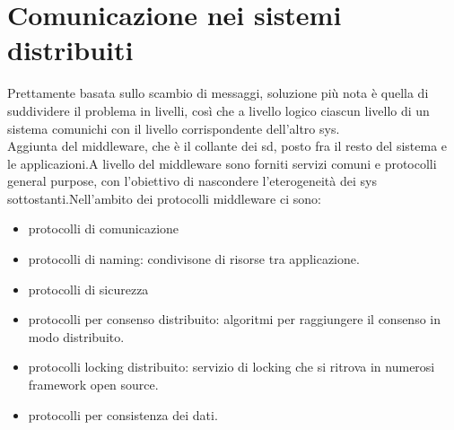 \documentclass{article}
\begin{document}
\section{Comunicazione nei sistemi distribuiti}
Prettamente basata sullo scambio di messaggi, soluzione più nota è quella di suddividere il problema in livelli, così che a livello logico ciascun livello di un sistema comunichi con il livello corrispondente dell'altro sys.\\
Aggiunta del middleware, che è il collante dei sd, posto fra il resto del sistema e le applicazioni.A livello del middleware sono forniti servizi comuni e protocolli general purpose, con l'obiettivo di nascondere l'eterogeneità dei sys sottostanti.Nell'ambito dei protocolli middleware ci sono:
\begin{itemize}
\item protocolli di comunicazione
\item protocolli di naming: condivisone di risorse tra applicazione.
\item protocolli di sicurezza
\item protocolli per consenso distribuito: algoritmi per raggiungere il consenso in modo distribuito.
\item protocolli locking distribuito: servizio di locking che si ritrova in numerosi framework open source.
\item protocolli per consistenza dei dati.
\end{itemize}
\end{document}
